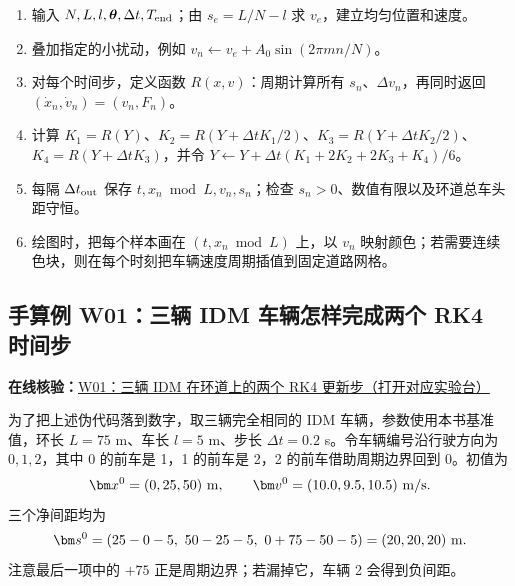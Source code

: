 \documentclass[11pt,a4paper,openany]{book}
\numberwithin{equation}{chapter}
\numberwithin{figure}{chapter}
\numberwithin{table}{chapter}
\newcommand{\onlinelab}[2]{%
  \par\smallskip\noindent
  {\small\sffamily\color{teal}\textbf{在线核验：}\href{https://cwan-ucr.github.io/traffic-stability-book/lab/?case=#1}{#2（打开对应实验台）}}%
  \par\smallskip}
\begin{document}
\begin{tcolorbox}[experimentbox,title=\textbf{微观环道仿真伪代码（RK4）}]
\small
\begin{enumerate}[leftmargin=1.7em,itemsep=2pt]
\item 输入 $N,L,l,\boldsymbol\theta,\Delta t,T_{\rm end}$；由 $s_e=L/N-l$ 求 $v_e$，建立均匀位置和速度。
\item 叠加指定的小扰动，例如 $v_n\leftarrow v_e+A_0\sin(2\pi mn/N)$。
\item 对每个时间步，定义函数 $R(x,v)$：周期计算所有 $s_n$、$\Delta v_n$，再同时返回 $(\dot x_n,\dot v_n)=(v_n,F_n)$。
\item 计算 $K_1=R(Y)$、$K_2=R(Y+\Delta tK_1/2)$、$K_3=R(Y+\Delta tK_2/2)$、$K_4=R(Y+\Delta tK_3)$，并令 $Y\leftarrow Y+\Delta t(K_1+2K_2+2K_3+K_4)/6$。
\item 每隔 $\Delta t_{\rm out}$ 保存 $t,x_n\bmod L,v_n,s_n$；检查 $s_n>0$、数值有限以及环道总车头距守恒。
\item 绘图时，把每个样本画在 $(t,x_n\bmod L)$ 上，以 $v_n$ 映射颜色；若需要连续色块，则在每个时刻把车辆速度周期插值到固定道路网格。
\end{enumerate}
\end{tcolorbox}

\subsection{手算例 W01：三辆 IDM 车辆怎样完成两个 RK4 时间步}
\onlinelab{W01}{W01：三辆 IDM 在环道上的两个 RK4 更新步}
\label{sub:worked-micro-rk4}

为了把上述伪代码落到数字，取三辆完全相同的 IDM 车辆，参数使用本书基准值，环长
$L=75$ m、车长 $l=5$ m、步长 $\Delta t=0.2$ s。令车辆编号沿行驶方向为
$0,1,2$，其中 0 的前车是 1，1 的前车是 2，2 的前车借助周期边界回到 0。初值为
\begin{equation}
\bm x^0=(0,25,50)\ {\rm m},\qquad
\bm v^0=(10.0,9.5,10.5)\ {\rm m/s}.
\label{eq:w01-initial}
\end{equation}
三个净间距均为
\[
\bm s^0=(25-0-5,\ 50-25-5,\ 0+75-50-5)=(20,20,20)\ {\rm m}.
\]
注意最后一项中的 $+75$ 正是周期边界；若漏掉它，车辆 2 会得到负间距。
\end{document}
